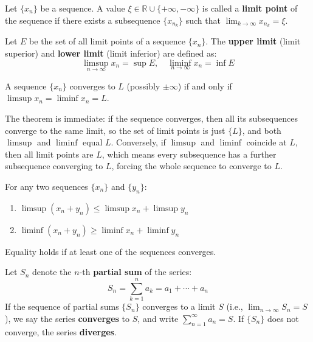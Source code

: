 \begin{definition}
Let $\{x_n\}$ be a sequence. A value $\xi \in \mathbb{R} \cup \{+\infty, -\infty\}$ is called a \textbf{limit point} of the sequence if there exists a subsequence $\{x_{n_k}\}$ such that $\lim_{k \to \infty} x_{n_k} = \xi$.
\end{definition}

\begin{definition}
Let $E$ be the set of all limit points of a sequence $\{x_n\}$. The \textbf{upper limit} (limit superior) and \textbf{lower limit} (limit inferior) are defined as:
\[ \limsup_{n \to \infty} x_n = \sup E, \quad \liminf_{n \to \infty} x_n = \inf E \]
\end{definition}

\begin{theorem}
A sequence $\{x_n\}$ converges to $L$ (possibly $\pm \infty$) if and only if $\limsup x_n = \liminf x_n = L$.
\end{theorem}

The theorem is immediate: if the sequence converges, then all its subsequences converge to the same limit, so the set of limit points is just $\{L\}$, and both $\limsup$ and $\liminf$ equal $L$. Conversely, if $\limsup$ and $\liminf$ coincide at $L$, then all limit points are $L$, which means every subsequence has a further subsequence converging to $L$, forcing the whole sequence to converge to $L$.

\begin{property}
For any two sequences $\{x_n\}$ and $\{y_n\}$:
\begin{enumerate}
    \item $\limsup (x_n + y_n) \le \limsup x_n + \limsup y_n$
    \item $\liminf (x_n + y_n) \ge \liminf x_n + \liminf y_n$
\end{enumerate}
Equality holds if at least one of the sequences converges.
\end{property}

\begin{definition}[Convergence]
Let $S_n$ denote the $n$-th \textbf{partial sum} of the series:
\[ S_n = \sum_{k=1}^{n} a_k = a_1 + \cdots + a_n \]
If the sequence of partial sums $\{S_n\}$ converges to a limit $S$ (i.e., $\lim_{n \to \infty} S_n = S$), we say the series \textbf{converges} to $S$, and write $\sum_{n=1}^{\infty} a_n = S$.
If $\{S_n\}$ does not converge, the series \textbf{diverges}.
\end{definition}

